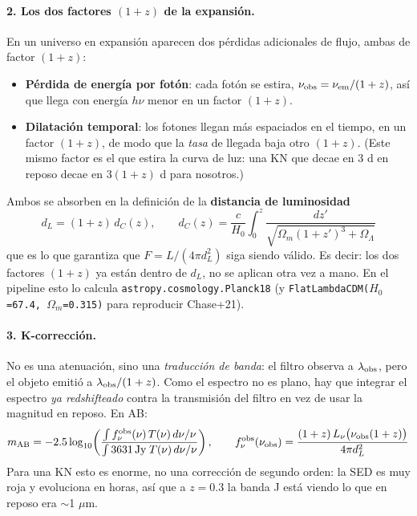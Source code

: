 \documentclass[11pt,a4paper]{article}
\newcommand{\code}[1]{\texttt{\small #1}}
\begin{document}
\paragraph{2. Los dos factores $(1+z)$ de la expansión.} En un universo en expansión aparecen dos
pérdidas adicionales de flujo, ambas de factor $(1+z)$:
\begin{itemize}[nosep]
  \item \textbf{Pérdida de energía por fotón}: cada fotón se estira,
        $\nu_{\rm obs} = \nu_{\rm em}/(1+z)$, así que llega con energía $h\nu$ menor en un factor
        $(1+z)$.
  \item \textbf{Dilatación temporal}: los fotones llegan más espaciados en el tiempo, en un factor
        $(1+z)$, de modo que la \emph{tasa} de llegada baja otro $(1+z)$. (Este mismo factor es el
        que estira la curva de luz: una KN que decae en 3 d en reposo decae en $3(1+z)$ d para
        nosotros.)
\end{itemize}
Ambos se absorben en la definición de la \textbf{distancia de luminosidad}
\begin{equation}
d_L = (1+z)\,d_C(z), \qquad d_C(z) = \frac{c}{H_0}\int_0^z \frac{dz'}{\sqrt{\Omega_m(1+z')^3+\Omega_\Lambda}}
\end{equation}
que es lo que garantiza que $F = L/(4\pi d_L^2)$ siga siendo válido. Es decir: los dos factores
$(1+z)$ ya están dentro de $d_L$, no se aplican otra vez a mano. En el pipeline esto lo calcula
\code{astropy.cosmology.Planck18} (y \code{FlatLambdaCDM($H_0$=67.4, $\Omega_m$=0.315)} para
reproducir Chase+21).

\paragraph{3. K-corrección.} No es una atenuación, sino una \emph{traducción de banda}: el filtro
observa a $\lambda_{\rm obs}$, pero el objeto emitió a $\lambda_{\rm obs}/(1+z)$. Como el espectro
no es plano, hay que integrar el espectro \emph{ya redshifteado} contra la transmisión del filtro
en vez de usar la magnitud en reposo. En AB:
\begin{equation}
m_{\rm AB} = -2.5\log_{10}\!\left(
\frac{\int f_\nu^{\rm obs}(\nu)\,T(\nu)\,d\nu/\nu}{\int 3631\,\text{Jy}\;T(\nu)\,d\nu/\nu}\right),
\qquad f_\nu^{\rm obs}(\nu_{\rm obs}) = \frac{(1+z)\,L_\nu\bigl(\nu_{\rm obs}(1+z)\bigr)}{4\pi d_L^2}
\end{equation}
Para una KN esto es enorme, no una corrección de segundo orden: la SED es muy roja y evoluciona en
horas, así que a $z=0.3$ la banda J está viendo lo que en reposo era $\sim$1 $\mu$m.
\end{document}
